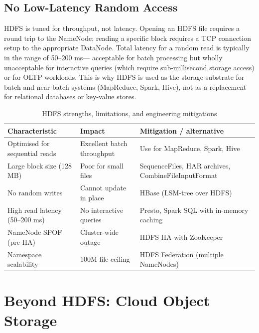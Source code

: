 \subsection{No Low-Latency Random Access}
\label{subsec:no-random-read}

HDFS is tuned for throughput, not latency. Opening an HDFS file
requires a round trip to the NameNode; reading a specific block
requires a TCP connection setup to the appropriate DataNode. Total
latency for a random read is typically in the range of 50--200 ms---
acceptable for batch processing but wholly unacceptable for
interactive queries (which require sub-millisecond storage access)
or for OLTP workloads. This is why HDFS is used as the storage
substrate for batch and near-batch systems (MapReduce, Spark, Hive),
not as a replacement for relational databases or key-value stores.

\begin{table}[h!t]
\centering
\caption{HDFS strengths, limitations, and engineering mitigations}
\label{tab:hdfs-limits}
\renewcommand{\arraystretch}{1.45}
\begin{tabular}{L{3.2cm} L{3.4cm} L{4.0cm}}
\toprule
\textbf{Characteristic} & \textbf{Impact} & \textbf{Mitigation / alternative} \\
\midrule
Optimised for sequential reads & Excellent batch throughput & Use for MapReduce, Spark, Hive \\
Large block size (128 MB)      & Poor for small files      & SequenceFiles, HAR archives, CombineFileInputFormat \\
No random writes               & Cannot update in place    & HBase (LSM-tree over HDFS) \\
High read latency (50--200 ms) & No interactive queries    & Presto, Spark SQL with in-memory caching \\
NameNode SPOF (pre-HA)         & Cluster-wide outage       & HDFS HA with ZooKeeper \\
Namespace scalability          & 100M file ceiling         & HDFS Federation (multiple NameNodes) \\
\bottomrule
\end{tabular}
\end{table}

\section{Beyond HDFS: Cloud Object Storage}
\label{sec:object-storage}

